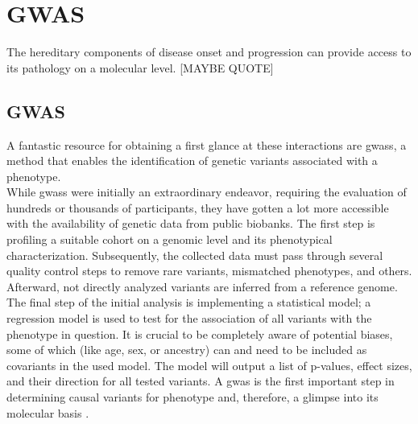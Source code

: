     \section{GWAS}
    \label{sec:gwas}
    The hereditary components of disease onset and progression can provide access to its pathology on a molecular level. [MAYBE QUOTE]

    \subsection{GWAS}
    \label{subsec:gwas_general}
    A fantastic resource for obtaining a first glance at these interactions are \acp{gwas}, a method that enables the identification of genetic variants associated with a phenotype.\\
    While \acp{gwas} were initially an extraordinary endeavor, requiring the evaluation of hundreds or thousands of participants, they have gotten a lot more accessible with the availability of genetic data from public biobanks. The first step is profiling a suitable cohort on a genomic level and its phenotypical characterization. Subsequently, the collected data must pass through several quality control steps to remove rare variants, mismatched phenotypes, and others. Afterward, not directly analyzed variants are inferred from a reference genome. The final step of the initial analysis is implementing a statistical model; a regression model is used to test for the association of all variants with the phenotype in question. It is crucial to be completely aware of potential biases, some of which (like age, sex, or ancestry) can and need to be included as covariants in the used model. \cite{uffelmannGenomewideAssociationStudies2021, flintGWAS2013} The model will output a list of p-values, effect sizes, and their direction for all tested variants. A \ac{gwas} is the first important step in determining causal variants for phenotype and, therefore, a glimpse into its molecular basis \cite{uffelmannGenomewideAssociationStudies2021}.

